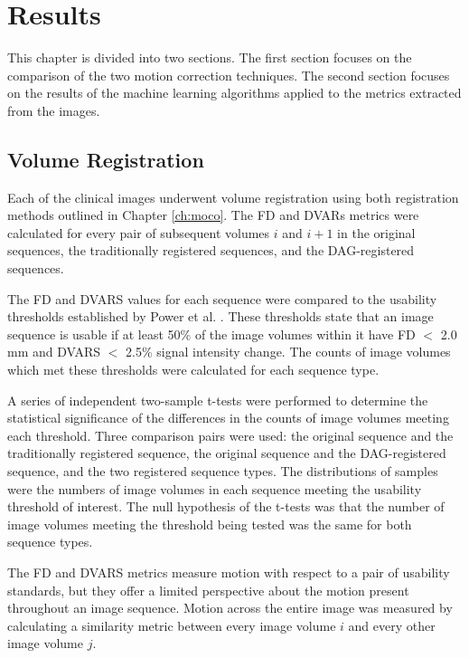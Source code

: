\chapter{Results}
\label{ch:results}

This chapter is divided into two sections. The first section focuses on the comparison of the two motion correction techniques. The second section focuses on the results of the machine learning algorithms applied to the metrics extracted from the images.

\section{Volume Registration} 

Each of the clinical images underwent volume registration using both registration methods outlined in Chapter \ref{ch:moco}. The FD and DVARs metrics were calculated for every pair of subsequent volumes $i$ and $i+1$ in the original sequences, the traditionally registered sequences, and the DAG-registered sequences. 

The FD and DVARS values for each sequence were compared to the usability thresholds established by Power et al. \cite{Power2012}. These thresholds state that an image sequence is usable if at least 50\% of the image volumes within it have FD $<$ 2.0 mm and DVARS $<$ 2.5\% signal intensity change. The counts of image volumes which met these thresholds were calculated for each sequence type.

A series of independent two-sample t-tests were performed to determine the statistical significance of the differences in the counts of image volumes meeting each threshold. Three comparison pairs were used: the original sequence and the traditionally registered sequence, the original sequence and the DAG-registered sequence, and the two registered sequence types. The distributions of samples were the numbers of image volumes in each sequence meeting the usability threshold of interest. The null hypothesis of the t-tests was that the number of image volumes meeting the threshold being tested was the same for both sequence types.

The FD and DVARS metrics measure motion with respect to a pair of usability standards, but they offer a limited perspective about the motion present throughout an image sequence. Motion across the entire image was measured by calculating a similarity metric between every image volume $i$ and every other image volume $j$. 

